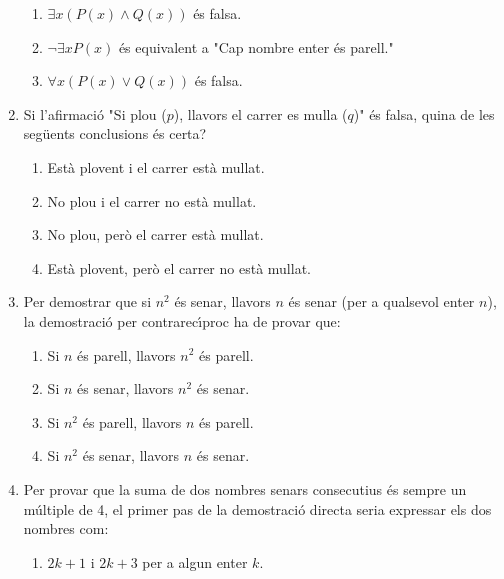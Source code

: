 \begin{enumerate}
\begin{enumerate}
\item $\exists x(P(x)\wedge Q(x))$ \'{e}s falsa.

\item $\lnot\exists xP(x)$ \'{e}s equivalent a "Cap nombre enter \'{e}s parell."

\item $\forall x(P(x)\vee Q(x))$ \'{e}s falsa.
\end{enumerate}

\item Si l'afirmaci\'{o} "Si plou ($p$), llavors el carrer es mulla ($q$)"
\'{e}s falsa, quina de les seg\"{u}ents conclusions \'{e}s certa?

\begin{enumerate}
\item Est\`{a} plovent i el carrer est\`{a} mullat.

\item No plou i el carrer no est\`{a} mullat.

\item No plou, per\`{o} el carrer est\`{a} mullat.

\item Est\`{a} plovent, per\`{o} el carrer no est\`{a} mullat.
\end{enumerate}

\item Per demostrar que si $n^{2}$ \'{e}s senar, llavors $n$ \'{e}s senar (per
a qualsevol enter $n$), la demostraci\'{o} per contrarec\'{\i}proc ha de
provar que:

\begin{enumerate}
\item Si $n$ \'{e}s parell, llavors $n^{2}$ \'{e}s parell.

\item Si $n$ \'{e}s senar, llavors $n^{2}$ \'{e}s senar.

\item Si $n^{2}$ \'{e}s parell, llavors $n$ \'{e}s parell.

\item Si $n^{2}$ \'{e}s senar, llavors $n$ \'{e}s senar.
\end{enumerate}

\item Per provar que la suma de dos nombres senars consecutius \'{e}s sempre
un m\'{u}ltiple de 4, el primer pas de la demostraci\'{o} directa seria
expressar els dos nombres com:

\begin{enumerate}
\item $2k+1$ i $2k+3$ per a algun enter $k$.


\end{enumerate}
\end{enumerate}

